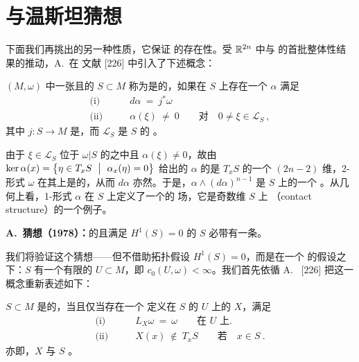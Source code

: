 
\section{\trContactType\trHypersurface{}与温斯坦猜想}
\label{sec:contact-type-weinstein}


下面我们再挑出\trHypersurface{}的另一种\trSymplectic{}性质，它保证%
\trClosedCharacteristic{}的存在性。受 $\mathbb{R}^{2n}$ 中\trConvex{}与%
\trStarShaped{}\trEnergySurface{}的首批整体性结果的推动，A.~\trWeinstein{}在%
文献 [226] 中引入了下述概念：

\begin{definition}\label{def:contact-type}
\trSymplecticManifold{} $(M,\omega)$ 中一张\trCompact{}且\trOrientable{}的%
\trHypersurface{} $S\subset M$ 称为是\trContactType{}的，如果在 $S$ 上存在一个%
\trOneForm{} $\alpha$ 满足
\begin{align*}
\text{(i)}\qquad & d\alpha\ =\ j^{*}\omega\\
\text{(ii)}\qquad & \alpha(\xi)\ \neq\ 0\qquad\text{对}\quad0\neq\xi\in\mathcal{L}_{S}\ ,
\end{align*}
其中 $j:S\to M$ 是\trInclusionMapping，而 $\mathcal{L}_{S}$ 是 $S$ 的%
\trCharacteristicLineBundle。
\end{definition}

由于 $\xi\in\mathcal{L}_{S}$ 位于 $\omega|S$ 的\trKernel{}之中且%
$\alpha(\xi)\neq0$，故由 $\ker\alpha(x)=\bigl\{\eta\in T_{x}S\ \bigm|\ %
\alpha_{x}(\eta)=0\bigr\}$ 给出的 $\alpha$ 的\trKernel{}是 $T_{x}S$ 的一个%
$(2n-2)$ 维\trSubspace，2-形式 $\omega$ 在其上是\trNondegenerate{}的，从而%
$d\alpha$ 亦然。于是，$\alpha\wedge(d\alpha)^{n-1}$ 是 $S$ 上的一个%
\trVolumeForm。从几何上看，1-形式 $\alpha$ 在 $S$ 上定义了一个\trSmooth{}的%
\trHyperplane{}场，它是奇数维\trManifold{} $S$ 上\textbf{\trContactStructure}%
（contact structure）的一个例子。

\textbf{A.~\trWeinstein{}猜想（1978）：}\quad\trContactType{}的且满足%
$H^{1}(S)=0$ 的\trHypersurface{} $S$ 必带有一条\trClosedCharacteristic。

我们将验证这个猜想——但不借助拓扑假设 $H^{1}(S)=0$，而是在一个%
\trSymplectic{}的假设之下：$S$ 有一个\trCapacity{}有限的\trNeighborhood{}%
$U\subset M$，即 $c_{0}(U,\omega)<\infty$。我们首先依循 A.~\trWeinstein{}%
[226] 把\trContactType{}这一概念重新表述如下：

\begin{proposition}\label{prop:contact-type-equiv}
\trCompact\trHypersurface{} $S\subset M$ 是\trContactType{}的，当且仅当存在一个%
定义在 $S$ 的\trNeighborhood{} $U$ 上的\trVectorField{} $X$，满足
\begin{align*}
\text{(i)}\qquad & L_{X}\omega\ =\ \omega\qquad\text{在 $U$ 上}.\\
\text{(ii)}\qquad & X(x)\ \notin\ T_{x}S\qquad\text{若}\quad x\in S\ .
\end{align*}
亦即，$X$ 与 $S$ \trTransversal。
\end{proposition}

